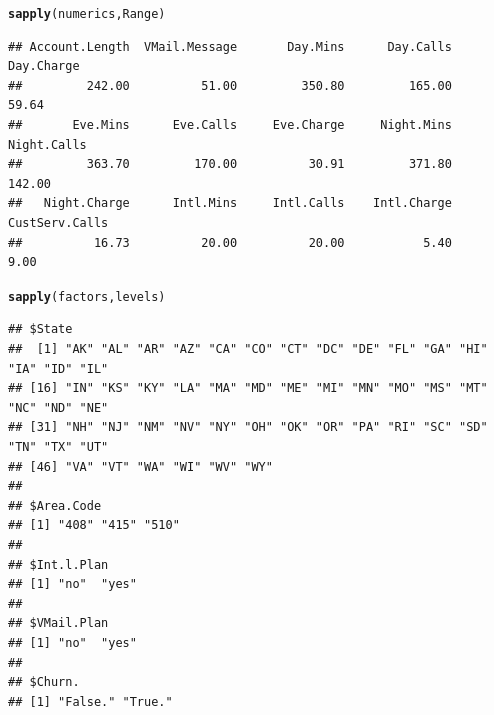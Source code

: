\documentclass{article}\usepackage[]{graphicx}\usepackage[]{color}
\makeatletter
\newcommand{\hlstd}[1]{\textcolor[rgb]{0.345,0.345,0.345}{#1}}%
\newcommand{\hlkwd}[1]{\textcolor[rgb]{0.737,0.353,0.396}{\textbf{#1}}}%
\newenvironment{kframe}{%
 \def\at@end@of@kframe{}%
 \ifinner\ifhmode%
  \def\at@end@of@kframe{\end{minipage}}%
  \begin{minipage}{\columnwidth}%
 \fi\fi%
 \def\FrameCommand##1{\hskip\@totalleftmargin \hskip-\fboxsep
 \colorbox{shadecolor}{##1}\hskip-\fboxsep
     \hskip-\linewidth \hskip-\@totalleftmargin \hskip\columnwidth}%
 \MakeFramed {\advance\hsize-\width
   \@totalleftmargin\z@ \linewidth\hsize
   \@setminipage}}%
 {\par\unskip\endMakeFramed%
 \at@end@of@kframe}
\newenvironment{knitrout}{}{} %
\makeatother
\begin{document}
\begin{description}
\begin{knitrout}
\color{fgcolor}\begin{kframe}
\begin{alltt}
\hlkwd{sapply}\hlstd{(numerics, Range)}
\end{alltt}
\begin{verbatim}
## Account.Length  VMail.Message       Day.Mins      Day.Calls     Day.Charge 
##         242.00          51.00         350.80         165.00          59.64 
##       Eve.Mins      Eve.Calls     Eve.Charge     Night.Mins    Night.Calls 
##         363.70         170.00          30.91         371.80         142.00 
##   Night.Charge      Intl.Mins     Intl.Calls    Intl.Charge CustServ.Calls 
##          16.73          20.00          20.00           5.40           9.00
\end{verbatim}
\end{kframe}
\end{knitrout}

\begin{knitrout}
\color{fgcolor}\begin{kframe}
\begin{alltt}
\hlkwd{sapply}\hlstd{(factors, levels)}
\end{alltt}
\begin{verbatim}
## $State
##  [1] "AK" "AL" "AR" "AZ" "CA" "CO" "CT" "DC" "DE" "FL" "GA" "HI" "IA" "ID" "IL"
## [16] "IN" "KS" "KY" "LA" "MA" "MD" "ME" "MI" "MN" "MO" "MS" "MT" "NC" "ND" "NE"
## [31] "NH" "NJ" "NM" "NV" "NY" "OH" "OK" "OR" "PA" "RI" "SC" "SD" "TN" "TX" "UT"
## [46] "VA" "VT" "WA" "WI" "WV" "WY"
## 
## $Area.Code
## [1] "408" "415" "510"
## 
## $Int.l.Plan
## [1] "no"  "yes"
## 
## $VMail.Plan
## [1] "no"  "yes"
## 
## $Churn.
## [1] "False." "True."
\end{verbatim}
\end{kframe}
\end{knitrout}


\end{description}
\end{document}
